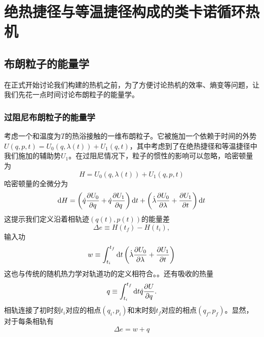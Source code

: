 \chapter{绝热捷径与等温捷径构成的类卡诺循环热机}
\section{布朗粒子的能量学}
\qquad 在正式开始讨论我们构建的热机之前，为了方便讨论热机的效率、熵变等问题，让我们先花一点时间讨论布朗粒子的能量学。
\subsection{过阻尼布朗粒子的能量学}

考虑一个和温度为$T$的热浴接触的一维布朗粒子。它被施加一个依赖于时间的外势$U(q,p,t) = U_0 (q,\lambda(t)) + U_1 (q,t)$，其中考虑到了在绝热捷径和等温捷径中我们施加的辅助势$U_1$。在过阻尼情况下，粒子的惯性的影响可以忽略，哈密顿量为
\begin{equation}
    H=U_0 (q,\lambda(t)) + U_1 (q,p,t)
    \label{eq31.1}
\end{equation}
哈密顿量的全微分为
\begin{equation}
    \mathrm{d} H=\left(\dot{q} \frac{\partial U_0}{\partial q} + \dot{q} \frac{\partial U_1}{\partial q}  \right) \mathrm{d} t+\left(\dot{\lambda} \frac{\partial U_0}{\partial \lambda} + \frac{\partial U_1}{\partial t} \right) \mathrm{d} t
    \label{eq31.2}
\end{equation}
这提示我们定义沿着相轨迹$(q(t), p(t))$的能量差\cite{Tu2013}
\begin{equation}
     \Delta e \equiv H\left(t_{f}\right)-H\left(t_{i}\right),
     \label{eq31.3}
\end{equation}
输入功
\begin{equation}
    w \equiv \int_{t_{i}}^{t_{f}} \mathrm{d} t \left( \dot{\lambda} \frac{\partial U_0}{\partial \lambda} + \frac{\partial U_1}{\partial t} \right)
    \label{eq31.4}
\end{equation}
这也与传统的随机热力学对轨道功的定义相符合。\cite{Sekimoto2010,Jarzynski1997,Sekimoto_1997}。还有吸收的热量
\begin{equation}
    q \equiv \int_{t_{i}}^{t_{f}} \mathrm{d} t \dot{q} \frac{\partial U}{\partial q} .
    \label{eq31.5}
\end{equation}
相轨连接了初时刻$t_i$对应的相点$(q_i , p_i )$和末时刻$t_f$对应的相点$(q_f , p_f )$。显然，对于每条相轨有
\begin{equation}
    \Delta e = w + q
    \label{eq31.6}
\end{equation}

